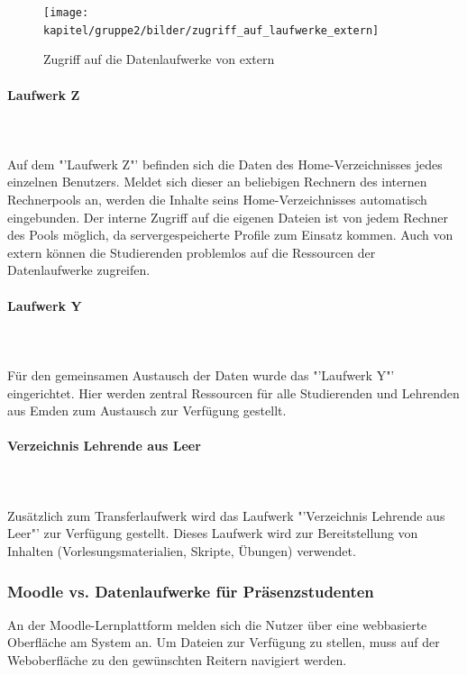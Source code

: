 \begin{figure}[h!]
	\centering
	\texttt{[image: kapitel/gruppe2/bilder/zugriff\_auf\_laufwerke\_extern]}
	\caption{Zugriff auf die Datenlaufwerke von extern \protect\footnotemark}
	\label{fig_zugriff_datenlaufwerke_extern}
\end{figure}


\paragraph{Laufwerk Z}\mbox{}\\\\

Auf dem "'Laufwerk Z"' befinden sich die Daten des Home-Verzeichnisses jedes einzelnen Benutzers. Meldet sich dieser an beliebigen Rechnern des internen Rechnerpools an, werden die Inhalte seins Home-Verzeichnisses automatisch eingebunden. Der interne Zugriff auf die eigenen Dateien ist von jedem Rechner des Pools möglich, da servergespeicherte Profile zum Einsatz kommen. Auch von extern können die Studierenden problemlos auf die Ressourcen der Datenlaufwerke zugreifen.

\paragraph{Laufwerk Y}\mbox{}\\\\

Für den gemeinsamen Austausch der Daten wurde das "'Laufwerk Y"' eingerichtet. Hier werden zentral Ressourcen für alle Studierenden und Lehrenden aus Emden zum Austausch zur Verfügung gestellt.

\paragraph{Verzeichnis Lehrende aus Leer}\mbox{}\\\\
Zusätzlich zum Transferlaufwerk wird das Laufwerk "'Verzeichnis Lehrende aus Leer"' zur Verfügung gestellt. Dieses Laufwerk wird zur Bereitstellung von Inhalten (Vorlesungsmaterialien, Skripte, Übungen) verwendet.

\subsubsection{Moodle vs. Datenlaufwerke für Präsenzstudenten}
An der Moodle-Lernplattform melden sich die Nutzer über eine webbasierte Oberfläche am System an. Um Dateien zur Verfügung zu stellen, muss auf der Weboberfläche zu den gewünschten Reitern navigiert werden.

